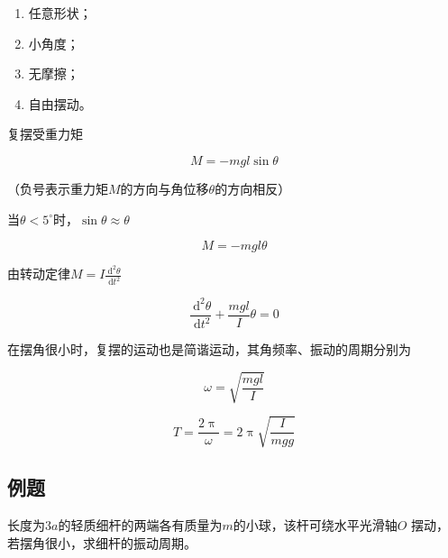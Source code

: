 \documentclass[12pt, a4paper]{article}
\numberwithin{equation}{section}
\newcommand{\degree}{^{\circ}}
\newcommand{\rmd}{\mathrm{~d}}
\begin{document}
    \begin{enumerate}
        \item 任意形状；
        \item 小角度；
        \item 无摩擦；
        \item 自由摆动。
    \end{enumerate}

    复摆受重力矩

    \[
        M = -mg l \sin \theta
    \]

    （负号表示重力矩\(M\)的方向与角位移\(\theta\)的方向相反）

    当\(\theta < 5\degree\)时，\(\sin \theta \approx \theta\)

    \[
        M = -mg l \theta
    \]

    由转动定律\(M = I \frac{\rmd^2 \theta}{\rmd t^2}\)

    \begin{equation}
        \frac{\rmd^2 \theta}{\rmd t^2} + \frac{mgl}{I}\theta = 0
    \end{equation}

    在摆角很小时，复摆的运动也是简谐运动，其角频率、振动的周期分别为

    \begin{equation}
        \omega = \sqrt{\frac{mgl}{I}}
    \end{equation}

    \begin{equation}
        T = \frac{2 \uppi}{\omega} = 2 \uppi \sqrt{\frac{I}{mgg}}
    \end{equation}

\subsection{例题}

    长度为\(3a\)的轻质细杆的两端各有质量为\(m\)的小球，该杆可绕水平光滑轴\(O\)
    摆动，若摆角很小，求细杆的振动周期。
\end{document}
